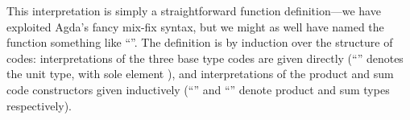 \documentclass[fleqn,runningheads]{llncs}
\begin{document}
\begin{code}%
\>[0]\AgdaSpace{}%
\AgdaSymbol{:}\AgdaSpace{}%
\AgdaSpace{}%
\AgdaSpace{}%
\<%
\\
\>[0]\AgdaOperator{\AgdaFunction{[[}}\AgdaSpace{}%
\AgdaSpace{}%
\AgdaOperator{\AgdaFunction{]]₀}}%
\>[15]\AgdaSymbol{=}\AgdaSpace{}%
\<%
\\
\>[0]\AgdaOperator{\AgdaFunction{[[}}\AgdaSpace{}%
\AgdaSpace{}%
\AgdaOperator{\AgdaFunction{]]₀}}%
\>[15]\AgdaSymbol{=}\AgdaSpace{}%
\<%
\\
\>[0]\AgdaOperator{\AgdaFunction{[[}}\AgdaSpace{}%
\AgdaSpace{}%
\AgdaOperator{\AgdaFunction{]]₀}}%
\>[15]\AgdaSymbol{=}\AgdaSpace{}%
\<%
\\
\>[0]\AgdaOperator{\AgdaFunction{[[}}\AgdaSpace{}%
\AgdaSpace{}%
\AgdaOperator{\AgdaInductiveConstructor{*}}\AgdaSpace{}%
\AgdaSpace{}%
\AgdaOperator{\AgdaFunction{]]₀}}%
\>[15]\AgdaSymbol{=}\AgdaSpace{}%
\AgdaOperator{\AgdaFunction{[[}}\AgdaSpace{}%
\AgdaSpace{}%
\AgdaOperator{\AgdaFunction{]]₀}}\AgdaSpace{}%
\AgdaSpace{}%
\AgdaOperator{\AgdaFunction{[[}}\AgdaSpace{}%
\AgdaSpace{}%
\AgdaOperator{\AgdaFunction{]]₀}}\<%
\\
\>[0]\AgdaOperator{\AgdaFunction{[[}}\AgdaSpace{}%
\AgdaSpace{}%
\AgdaOperator{\AgdaInductiveConstructor{+}}\AgdaSpace{}%
\AgdaSpace{}%
\AgdaOperator{\AgdaFunction{]]₀}}%
\>[15]\AgdaSymbol{=}\AgdaSpace{}%
\AgdaSpace{}%
\AgdaOperator{\AgdaFunction{[[}}\AgdaSpace{}%
\AgdaSpace{}%
\AgdaOperator{\AgdaFunction{]]₀}}\AgdaSpace{}%
\AgdaOperator{\AgdaFunction{[[}}\AgdaSpace{}%
\AgdaSpace{}%
\AgdaOperator{\AgdaFunction{]]₀}}\<%
\end{code}
This interpretation is simply a straightforward function definition---we have exploited Agda's fancy mix-fix syntax, but we might as well have named the function something like ``''. The definition is by induction over the structure of codes: interpretations of the three base type codes are given directly (``'' denotes the unit type, with sole element ), and interpretations of the product and sum code constructors given inductively (``'' and ``'' denote product and sum types respectively).
\end{document}
